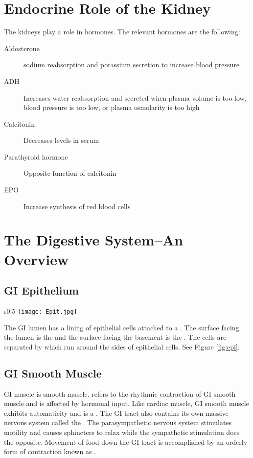 \documentclass[../Bio_chemistryReview.tex]{subfiles}
\begin{document}
\section{Endocrine Role of the Kidney}
The kidneys play a role in hormones. The relevant hormones are the following:
\begin{description}
    \item[Aldosterone] sodium reabsorption and potassium secretion to increase
        blood pressure
    \item[ADH] Increases water reabsorption and secreted when plasma volume is
        too low, blood pressure is too low, or plasma osmolarity is too high
    \item[Calcitonin] Decreases  levels in serum
    \item[Parathyroid hormone] Opposite function of calcitonin
    \item[EPO] Increase synthesis of red blood cells
\end{description}

\section{The Digestive System--An Overview}
\subsection{GI Epithelium}
\begin{wrapfigure}{r}{0.5\textwidth}
    \centering
    \texttt{[image: Epit.jpg]}
    \caption{Epithelial Cells}
    \label{fig:epi}
\end{wrapfigure}
The GI lumen has a lining of epithelial cells attached to a . The surface facing the lumen is the  and the
surface facing the basement is the . The cells are
separated by  which run around the sides of epithelial
cells. See Figure \ref{fig:epi}.

\subsection{GI Smooth Muscle}
GI muscle is smooth muscle.  refers to the rhythmic
contraction of GI smooth muscle and is affected by hormonal input. Like cardiac
muscle, GI smooth muscle exhibits automaticity and is a . The GI tract also contains its own massive nervous system called the
. The parasympathetic nervous system stimulates
motility and causes sphincters to relax while the sympathetic stimulation does
the opposite. Movement of food down the GI tract is accomplished by an orderly
form of contraction known as .
\end{document}
